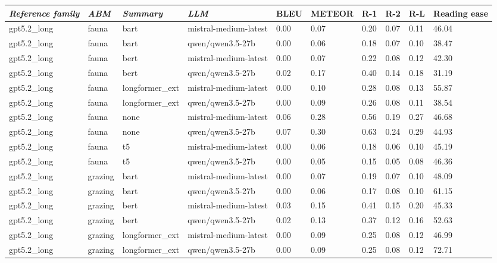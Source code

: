 \begin{tabular}{|l|l|l|l|l|l|l|l|l|l|}
\hline
\textit{\textbf{Reference family}} & \textit{\textbf{ABM}} & \textit{\textbf{Summary}} & \textit{\textbf{LLM}} & BLEU & METEOR & R-1 & R-2 & R-L & Reading ease \\
 \hline
 gpt5.2\_long & fauna & bart & mistral-medium-latest & 0.00 & 0.07 & 0.20 & 0.07 & 0.11 & 46.04 \\
 \hline
 gpt5.2\_long & fauna & bart & qwen/qwen3.5-27b & 0.00 & 0.06 & 0.18 & 0.07 & 0.10 & 38.47 \\
 \hline
 gpt5.2\_long & fauna & bert & mistral-medium-latest & 0.00 & 0.07 & 0.22 & 0.08 & 0.12 & 42.30 \\
 \hline
 gpt5.2\_long & fauna & bert & qwen/qwen3.5-27b & 0.02 & 0.17 & 0.40 & 0.14 & 0.18 & 31.19 \\
 \hline
 gpt5.2\_long & fauna & longformer\_ext & mistral-medium-latest & 0.00 & 0.10 & 0.28 & 0.08 & 0.13 & 55.87 \\
 \hline
 gpt5.2\_long & fauna & longformer\_ext & qwen/qwen3.5-27b & 0.00 & 0.09 & 0.26 & 0.08 & 0.11 & 38.54 \\
 \hline
 gpt5.2\_long & fauna & none & mistral-medium-latest & 0.06 & 0.28 & 0.56 & 0.19 & 0.27 & 46.68 \\
 \hline
 gpt5.2\_long & fauna & none & qwen/qwen3.5-27b & 0.07 & 0.30 & 0.63 & 0.24 & 0.29 & 44.93 \\
 \hline
 gpt5.2\_long & fauna & t5 & mistral-medium-latest & 0.00 & 0.06 & 0.18 & 0.06 & 0.10 & 45.19 \\
 \hline
 gpt5.2\_long & fauna & t5 & qwen/qwen3.5-27b & 0.00 & 0.05 & 0.15 & 0.05 & 0.08 & 46.36 \\
 \hline
 gpt5.2\_long & grazing & bart & mistral-medium-latest & 0.00 & 0.07 & 0.19 & 0.07 & 0.10 & 48.09 \\
 \hline
 gpt5.2\_long & grazing & bart & qwen/qwen3.5-27b & 0.00 & 0.06 & 0.17 & 0.08 & 0.10 & 61.15 \\
 \hline
 gpt5.2\_long & grazing & bert & mistral-medium-latest & 0.03 & 0.15 & 0.41 & 0.15 & 0.20 & 45.33 \\
 \hline
 gpt5.2\_long & grazing & bert & qwen/qwen3.5-27b & 0.02 & 0.13 & 0.37 & 0.12 & 0.16 & 52.63 \\
 \hline
 gpt5.2\_long & grazing & longformer\_ext & mistral-medium-latest & 0.00 & 0.09 & 0.25 & 0.08 & 0.12 & 46.99 \\
 \hline
 gpt5.2\_long & grazing & longformer\_ext & qwen/qwen3.5-27b & 0.00 & 0.09 & 0.25 & 0.08 & 0.12 & 72.71 \\

\end{tabular}
